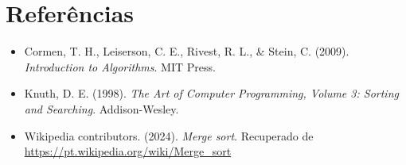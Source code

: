 \documentclass[a4paper,12pt]{article}
\begin{document}
\section{Referências}

\begin{itemize}
    \item Cormen, T. H., Leiserson, C. E., Rivest, R. L., \& Stein, C. (2009). \textit{Introduction to Algorithms}. MIT Press.
    \item Knuth, D. E. (1998). \textit{The Art of Computer Programming, Volume 3: Sorting and Searching}. Addison-Wesley.
    \item Wikipedia contributors. (2024). \textit{Merge sort}. Recuperado de \url{https://pt.wikipedia.org/wiki/Merge_sort}
\end{itemize}
\end{document}
